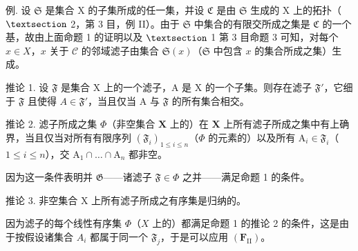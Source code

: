 例. 设 \(\mathfrak{S}\) 是集合 X 的子集所成的任一集，并设 \(\mathfrak{C}\) 是由 \(\mathfrak{S}\) 生成的 X 上的拓扑（\(\S\) 2，第 3 目，例 II）。由于 \(\mathfrak{S}\) 中集合的有限交所成之集是 \(\mathfrak{C}\) 的一个基，故由上面命题 1 的证明以及 \(\S\) 1 第 3 目命题 3 可知，对每个 \(x \in X\)，\(x\) 关于 \(\mathcal{C}\) 的邻域滤子由集合 \(\mathfrak{S}(x)\)（\(\mathfrak{S}\) 中包含 \(x\) 的集合所成之集）生成。

推论 1. 设 \(\mathfrak{F}\) 是集合 X 上的一个滤子，A 是 X 的一个子集。则存在滤子 \(\mathfrak{F}'\)，它细于 \(\mathfrak{F}\) 且使得 \(A \in \mathfrak{F}'\)，当且仅当 A 与 \(\mathfrak{F}\) 的所有集合相交。

推论 2. 滤子所成之集 \(\Phi\)（非空集合 \(\mathbf{X}\) 上的）在 \(\mathbf{X}\) 上所有滤子所成之集中有上确界，当且仅当对所有有限序列 \((\mathfrak{F}_i)_{1\leqslant i\leqslant n}\)（\(\Phi\) 的元素的）以及所有 \(\mathrm{A}_i\in \mathfrak{F}_i\)（\(1\leqslant i\leqslant n\)），交 \(\mathrm{A}_1\cap \dots \cap \mathrm{A}_n\) 都非空。

因为这一条件表明并 \(\mathfrak{G}\)——诸滤子 \(\mathfrak{F} \in \Phi\) 之并——满足命题 1 的条件。

推论 3. 非空集合 X 上所有滤子所成之有序集是归纳的。

因为滤子的每个线性有序集 \(\Phi\)（\(X\) 上的）都满足命题 1 的推论 2 的条件，这是由于按假设诸集合 \(A_{i}\) 都属于同一个 \(\mathfrak{F}_{j}\)，于是可以应用 \((\mathbf{F}_{\mathrm{II}})\)。

